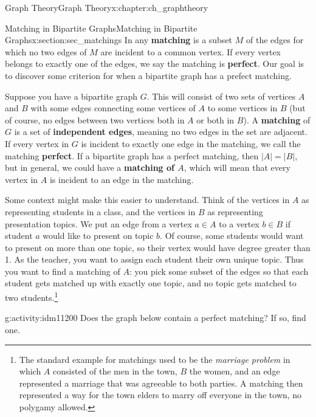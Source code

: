 \documentclass[oneside,10pt,]{book}
\newcommand{\terminology}[1]{\textbf{#1}}
\numberwithin{equation}{chapter}
\newcommand{\card}[1]{\left| #1 \right|}
\begin{document}
\begin{chapterptx}{Graph Theory}{}{Graph Theory}{}{}{x:chapter:ch_graphtheory}
%
%
\typeout{************************************************}
\typeout{************************************************}
%
\begin{sectionptx}{Matching in Bipartite Graphs}{}{Matching in Bipartite Graphs}{}{}{x:section:sec_matchings}
In any \terminology{matching} is a subset \(M\) of the edges for which no two edges of \(M\) are incident to a common vertex.  If every vertex belongs to exactly one of the edges, we say the matching is \terminology{perfect}. Our goal is to discover some criterion for when a bipartite graph has a prefect matching.%
\par
{} Suppose you have a bipartite graph \(G\). This will consist of two sets of vertices \(A\) and \(B\) with some edges connecting some vertices of \(A\) to some vertices in \(B\) (but of course, no edges between two vertices both in \(A\) or both in \(B\)). A \terminology{matching} of \(G\) is a set of \terminology{independent edges}, meaning no two edges in the set are adjacent.  If every vertex in \(G\) is incident to exactly one edge in the matching, we call the matching \terminology{perfect}. If a bipartite graph has a perfect matching, then \(\card{A} = \card{B}\), but in general, we could have a \terminology{matching of \(A\)}, which will mean that every vertex in \(A\) is incident to an edge in the matching.%
\par
Some context might make this easier to understand. Think of the vertices in \(A\) as representing students in a class, and the vertices in \(B\) as representing presentation topics. We put an edge from a vertex \(a \in A\) to a vertex \(b \in B\) if student \(a\) would like to present on topic \(b\). Of course, some students would want to present on more than one topic, so their vertex would have degree greater than 1. As the teacher, you want to assign each student their own unique topic. Thus you want to find a matching of \(A\): you pick some subset of the edges so that each student gets matched up with exactly one topic, and no topic gets matched to two students.\footnote{The standard example for matchings used to be the \emph{marriage problem} in which \(A\) consisted of the men in the town, \(B\) the women, and an edge represented a marriage that was agreeable to both parties.  A matching then represented a way for the town elders to marry off everyone in the town, no polygamy allowed.\label{g:fn:idm11196}}%
\begin{activity}{}{g:activity:idm11200}%
Does the graph below contain a perfect matching? If so, find one.%

\end{activity}
\end{sectionptx}
\end{chapterptx}
\end{document}
